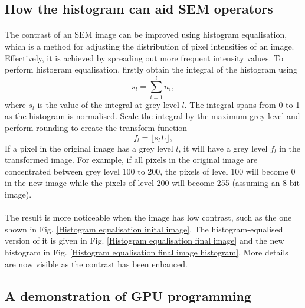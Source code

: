 \documentclass[12pt, twocolumn]{report}
\begin{document}
\subsection{How the histogram can aid SEM operators}
\paragraph{}
The contrast of an SEM image can be improved using histogram equalisation, which is a method for adjusting the distribution of pixel intensities of an image. Effectively, it is achieved by spreading out more frequent intensity values. To perform histogram equalisation, firstly obtain the integral of the histogram using
\[s_l = \sum_{i=1}^{l} n_i,\]
where $s_l$ is the value of the integral at grey level $l$. The integral spans from 0 to 1 as the histogram is normalised. Scale the integral by the maximum grey level and perform rounding to create the transform function
\begin{equation}
    f_l = \lfloor s_lL \rfloor,
    \label{Histogram equalisation transform function}
\end{equation}
If a pixel in the original image has a grey level $l$, it will have a grey level $f_l$ in the transformed image. For example, if all pixels in the original image are concentrated between grey level 100 to 200, the pixels of level 100 will become 0 in the new image while the pixels of level 200 will become 255 (assuming an 8-bit image).

\paragraph{}
The result is more noticeable when the image has low contrast, such as the one shown in Fig. \ref{Histogram equalisation inital image}. The histogram-equalised version of it is given in Fig. \ref{Histogram equalisation final image} and the new histogram in Fig. \ref{Histogram equalisation final image histogram}. More details are now visible as the contrast has been enhanced.

\subsection{A demonstration of GPU programming}
\end{document}
